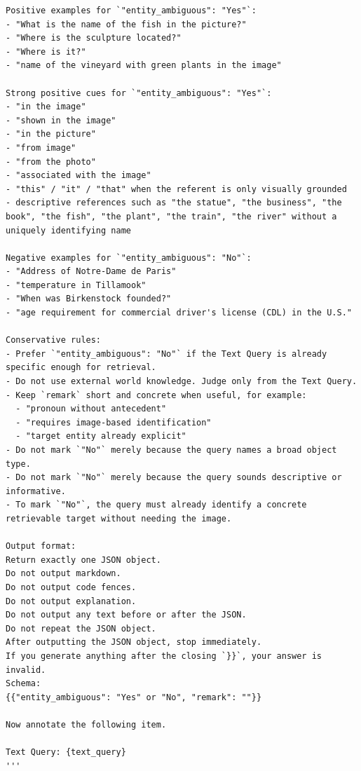 \begin{verbatim}
Positive examples for `"entity_ambiguous": "Yes"`:
- "What is the name of the fish in the picture?"
- "Where is the sculpture located?"
- "Where is it?"
- "name of the vineyard with green plants in the image"

Strong positive cues for `"entity_ambiguous": "Yes"`:
- "in the image"
- "shown in the image"
- "in the picture"
- "from image"
- "from the photo"
- "associated with the image"
- "this" / "it" / "that" when the referent is only visually grounded
- descriptive references such as "the statue", "the business", "the book", "the fish", "the plant", "the train", "the river" without a uniquely identifying name

Negative examples for `"entity_ambiguous": "No"`:
- "Address of Notre-Dame de Paris"
- "temperature in Tillamook"
- "When was Birkenstock founded?"
- "age requirement for commercial driver's license (CDL) in the U.S."

Conservative rules:
- Prefer `"entity_ambiguous": "No"` if the Text Query is already specific enough for retrieval.
- Do not use external world knowledge. Judge only from the Text Query.
- Keep `remark` short and concrete when useful, for example:
  - "pronoun without antecedent"
  - "requires image-based identification"
  - "target entity already explicit"
- Do not mark `"No"` merely because the query names a broad object type.
- Do not mark `"No"` merely because the query sounds descriptive or informative.
- To mark `"No"`, the query must already identify a concrete retrievable target without needing the image.

Output format:
Return exactly one JSON object.
Do not output markdown.
Do not output code fences.
Do not output explanation.
Do not output any text before or after the JSON.
Do not repeat the JSON object.
After outputting the JSON object, stop immediately.
If you generate anything after the closing `}}`, your answer is invalid.
Schema:
{{"entity_ambiguous": "Yes" or "No", "remark": ""}}

Now annotate the following item.

Text Query: {text_query}
'''
\end{verbatim}

